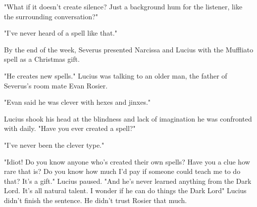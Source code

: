 "What if it doesn't create silence? Just a background hum for the listener, like the surrounding conversation?"

"I've never heard of a spell like that."

By the end of the week, Severus presented Narcissa and Lucius with the Muffliato spell as a Christmas gift.

"He creates new spells." Lucius was talking to an older man, the father of Severus's room mate Evan Rosier.

"Evan said he was clever with hexes and jinxes."

Lucius shook his head at the blindness and lack of imagination he was confronted with daily. "Have you ever created a spell?"

"I've never been the clever type."

"Idiot! Do you know anyone who's created their own spells? Have you a clue how rare that is? Do you know how much I'd pay if someone could teach me to do that? It's a gift." Lucius paused. "And he's never learned anything from the Dark Lord. It's all natural talent. I wonder if he can do things the Dark Lord{\el}" Lucius didn't finish the sentence. He didn't trust Rosier that much.


